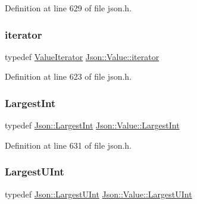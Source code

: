 Definition at line 629 of file json.\+h.

\mbox{\label{class_json_1_1_value_a341cdf2e01f8b3c5b7317aa2f0768c53}} 
\subsubsection{\texorpdfstring{iterator}{iterator}}
{\footnotesize\ttfamily typedef \hyperlink{class_json_1_1_value_iterator}{Value\+Iterator} \hyperlink{class_json_1_1_value_a341cdf2e01f8b3c5b7317aa2f0768c53}{Json\+::\+Value\+::iterator}}



Definition at line 623 of file json.\+h.

\mbox{\label{class_json_1_1_value_a1cbb82642ed05109b9833e49f042ece7}} 
\subsubsection{\texorpdfstring{Largest\+Int}{LargestInt}}
{\footnotesize\ttfamily typedef \hyperlink{namespace_json_a218d880af853ce786cd985e82571d297}{Json\+::\+Largest\+Int} \hyperlink{class_json_1_1_value_a1cbb82642ed05109b9833e49f042ece7}{Json\+::\+Value\+::\+Largest\+Int}}



Definition at line 631 of file json.\+h.

\mbox{\label{class_json_1_1_value_a6682a3684d635e03fc06ba229fa24eec}} 
\subsubsection{\texorpdfstring{Largest\+U\+Int}{LargestUInt}}
{\footnotesize\ttfamily typedef \hyperlink{namespace_json_ae202ecad69725e23443f465e257456d0}{Json\+::\+Largest\+U\+Int} \hyperlink{class_json_1_1_value_a6682a3684d635e03fc06ba229fa24eec}{Json\+::\+Value\+::\+Largest\+U\+Int}}



